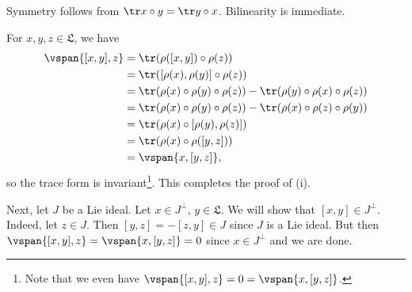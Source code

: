 Symmetry follows from $\tr x \circ y = \tr y \circ x$. Bilinearity is
immediate.

For $x, y, z \in \mathfrak{L}$, we have
\begin{align*}
	\vspan{[x, y], z} &= \tr(\rho([x, y]) \circ \rho(z))\\
	&= \tr([\rho(x), \rho(y)] \circ \rho(z))\\
	&= \tr(\rho(x)\circ\rho(y)\circ\rho(z)) - \tr(\rho(y)\circ\rho(x)\circ\rho(z))\\
	&= \tr(\rho(x)\circ\rho(y)\circ\rho(z)) - \tr(\rho(x)\circ\rho(z)\circ\rho(y))\\
	&= \tr(\rho(x) \circ [\rho(y), \rho(z)])\\
	&= \tr(\rho(x) \circ \rho([y, z]))\\
	&= \vspan{x, [y, z]},
\end{align*}
so the trace form is invariant\footnote{Note that we even have $\vspan{[x, y], z} = 0 = \vspan{x, [y, z]}$.}.
This completes the proof of (i).

Next, let $J$ be a Lie ideal. Let $x \in J^\perp$, $y \in \mathfrak{L}$.
We will show that $[x, y] \in J^\perp$. Indeed, let $z \in J$.
Then  $[y, z] = -[z, y] \in J$ since $J$ is a Lie ideal. But then
$\vspan{[x, y], z} = \vspan{x, [y, z]} = 0$ since $x \in J^\perp$ and we are
done.

